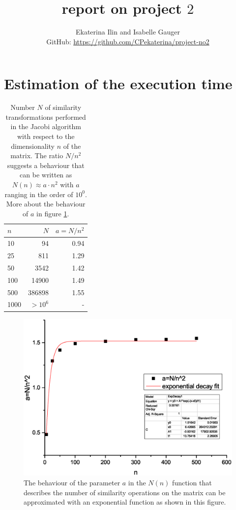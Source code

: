 \documentclass[11pt,a4wide]{article}
\begin{document}
\title{report on project $2$}
\author{Ekaterina Ilin and Isabelle Gauger\\GitHub: \url{https://github.com/CPekaterina/project-no2}
}
\maketitle
\tableofcontents
\newpage
\section{Estimation of the execution time}
\begin{table}%
\centering
\caption{Number $N$ of similarity transformations performed in the Jacobi algorithm with respect to the dimensionality $n$ of the matrix. The ratio $N/n^2$ suggests a behaviour that can be written as $N(n)\approx a\cdot n^2$ with $a$ ranging in the order of $10^0$. More about the behaviour of $a$ in figure \ref{fig:a}.}
\begin{tabular}{lrr}\hline
$n$ & $N$ & $a=N/n^2$\\\hline
10 & 94 & 0.94\\
25 & 811 & 1.29\\
50 & 3542 & 1.42\\
100 & 14900 &1.49\\
500 & 386898 &1.55\\
1000 & $>10^6$ &-\\\hline
\end{tabular}
\label{tab:extime}
\end{table}
\begin{figure}[T]%
\centering
\includegraphics[scale=0.45]{b2.eps}%
\caption{The behaviour of the parameter $a$ in the $N(n)$ function that describes the number of similarity operations on the matrix can be approximated with an exponential function as shown in this figure.}%
\label{fig:a}%
\end{figure}
\end{document}
